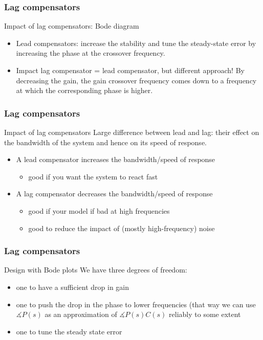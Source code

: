 \begin{frame}
	\frametitle{Lag compensators}
	\begin{block}{Impact of lag compensators: Bode diagram}
	\begin{itemize}
		\item Lead compensators: increase the stability and tune the steady-state error by increasing the phase at the crossover frequency.
		\item Impact lag compensator = lead compensator, but different approach!
		By decreasing the gain, the gain crossover frequency comes down to a frequency at which the corresponding phase is higher.
		
	\end{itemize}
	\end{block}
\end{frame}

\begin{frame}
	\frametitle{Lag compensators}
	\begin{block}{Impact of lag compensators}
		Large difference between lead and lag: their effect on the bandwidth of the system and hence on its speed of response.
		\begin{itemize}
			\item A lead compensator increases the bandwidth/speed of response 
			\begin{itemize} 
			\item good if you want the system to react fast
			\end{itemize}
			\item A lag compensator decreases the bandwidth/speed of response 
			\begin{itemize}
			\item good if your model if bad at high frequencies
			\item good to reduce the impact of (mostly high-frequency) noise 
			\end{itemize}
		\end{itemize}
	\end{block}
\end{frame}

\begin{frame}
\frametitle{Lag compensators}
\begin{block}{Design with Bode plots}
We have three degrees of freedom:
\begin{itemize}
	\item one to have a sufficient drop in gain
	\item one to push the drop in the phase to lower frequencies (that way we can use $\measuredangle P(s)$ as an approximation of $\measuredangle P(s)C(s)$ reliably to some extent
	\item one to tune the steady state error
\end{itemize}
		
\end{block}
\end{frame}

